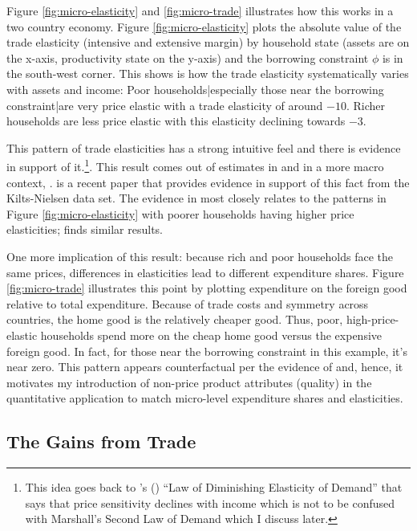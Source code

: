 \documentclass[12pt,pdftex]{article}
\def\citeapos#1{\citeauthor{#1}'s (\citeyear{#1})}
\begin{document}
\begin{onehalfspacing}
Figure \ref{fig:micro-elasticity} and \ref{fig:micro-trade} illustrates how this works in a two country economy. Figure \ref{fig:micro-elasticity} plots the absolute value of the trade elasticity (intensive and extensive margin) by household state (assets are on the x-axis, productivity state on the y-axis) and the borrowing constraint $\phi$ is in the south-west corner. This shows is how the trade elasticity systematically varies with assets and income: Poor households|especially those near the borrowing constraint|are very price elastic with a trade elasticity of around $-10$. Richer households are less price elastic with this elasticity declining towards $-3.$

This pattern of trade elasticities has a strong intuitive feel and there is evidence in support of it.\footnote{This idea goes back to \citeapos{harrod1936trade} ``Law of Diminishing Elasticity of Demand'' that says that price sensitivity declines with income which is not to be confused with Marshall's Second Law of Demand which I discuss later.}. This result comes out of estimates in \citet{berry1995automobile} and in a more macro context, \citet{nakamura2010accounting}. \citet{sangani2022markups} is a recent paper that provides evidence in support of this fact from the Kilts-Nielsen data set. The evidence in \citet*{auer2022unequal} most closely relates to the patterns in Figure \ref{fig:micro-elasticity} with poorer households having higher price elasticities; \citet*{colicev2022impact} finds similar results.

One more implication of this result: because rich and poor households face the same prices, differences in elasticities lead to different expenditure shares. Figure \ref{fig:micro-trade} illustrates this point by plotting expenditure on the foreign good relative to total expenditure. Because of trade costs and symmetry across countries, the home good is the relatively cheaper good. Thus, poor, high-price-elastic households spend more on the cheap home good versus the expensive foreign good. In fact, for those near the borrowing constraint in this example, it's near zero. This pattern appears counterfactual per the evidence of \citet{borusyak2021distributional} and, hence, it motivates my introduction of non-price product attributes (quality) in the quantitative application to match micro-level expenditure shares and elasticities.

\subsection{The Gains from Trade}


\end{onehalfspacing}
\end{document}
